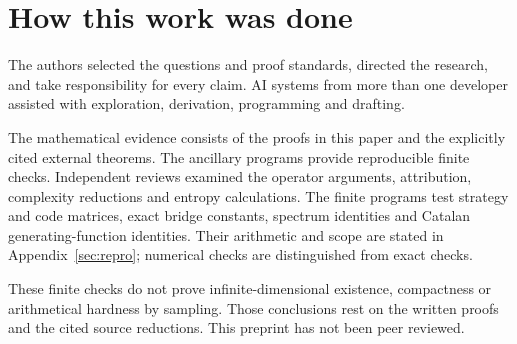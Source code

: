 \section*{How this work was done}\label{sec:methods}

The authors selected the questions and proof standards, directed the research, and take responsibility for every claim. AI systems from more than one developer assisted with exploration, derivation, programming and drafting.

The mathematical evidence consists of the proofs in this paper and the explicitly cited external theorems. The ancillary programs provide reproducible finite checks. Independent reviews examined the operator arguments, attribution, complexity reductions and entropy calculations. The finite programs test strategy and code matrices, exact bridge constants, spectrum identities and Catalan generating-function identities. Their arithmetic and scope are stated in Appendix~\ref{sec:repro}; numerical checks are distinguished from exact checks.

These finite checks do not prove infinite-dimensional existence, compactness or arithmetical hardness by sampling. Those conclusions rest on the written proofs and the cited source reductions. This preprint has not been peer reviewed.
